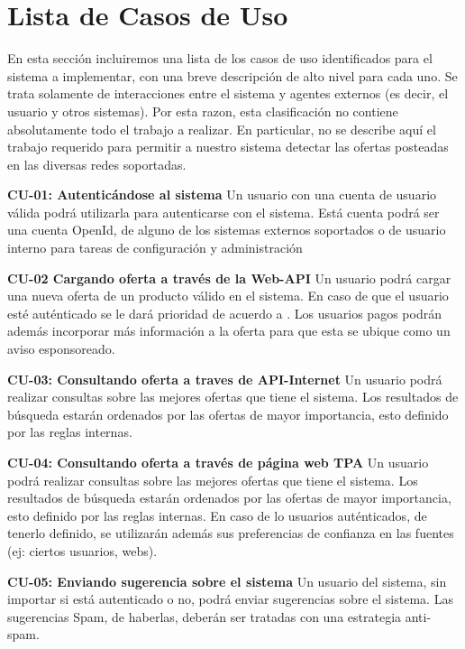 \section*{Lista de Casos de Uso}
 En esta sección incluiremos una lista de los casos de uso identificados para el sistema a implementar, con una breve descripción de alto nivel para cada uno. Se trata solamente de interacciones entre el sistema y agentes externos (es decir, el usuario y otros sistemas). Por esta razon, esta clasificación no contiene absolutamente todo el trabajo a realizar.  
    En particular, no se describe aquí el trabajo requerido para permitir a nuestro sistema detectar las ofertas posteadas en las diversas redes soportadas. 

\textbf{CU-01: Autenticándose al sistema} Un usuario con una cuenta de usuario válida podrá utilizarla para autenticarse con el sistema. Está cuenta podrá ser una cuenta OpenId, de alguno de los sistemas externos soportados o de usuario interno para tareas de configuración y administración

\textbf{CU-02 Cargando oferta a través de la Web-API} Un usuario podrá cargar una nueva oferta de un producto válido en el sistema. En caso de que el usuario esté auténticado se le dará prioridad de acuerdo a . Los usuarios pagos podrán además incorporar más información a la oferta para que esta se ubique como un aviso esponsoreado.

\textbf{CU-03: Consultando oferta a traves de API-Internet} Un usuario podrá realizar consultas sobre las mejores ofertas que tiene el sistema. Los resultados de búsqueda estarán ordenados por las ofertas de mayor importancia, esto definido por las reglas internas.

\textbf{CU-04: Consultando oferta a través de página web TPA} Un usuario podrá realizar consultas sobre las mejores ofertas que tiene el sistema. Los resultados de búsqueda estarán ordenados por las ofertas de mayor importancia, esto definido por las reglas internas. En caso de lo usuarios auténticados, de tenerlo definido, se utilizarán además sus preferencias de confianza en las fuentes (ej: ciertos usuarios, webs).

\textbf{CU-05: Enviando sugerencia sobre el sistema} Un usuario del sistema, sin importar si está autenticado o no, podrá enviar sugerencias sobre el sistema. Las sugerencias Spam, de haberlas, deberán ser tratadas con una estrategia anti-spam.
